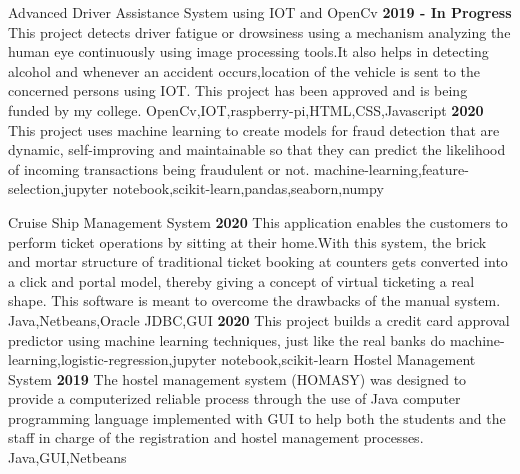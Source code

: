 %
%
%


\begin{projects}
    \project
    {Advanced Driver Assistance System using IOT and OpenCv}
    {\bf\textcolor{Mahogany}{2019 - In Progress}}
    {{}}
    {This project detects driver fatigue or drowsiness using a mechanism analyzing the human eye continuously using image processing tools.It also helps in detecting alcohol and whenever an accident occurs,location of the vehicle is sent to the concerned persons using IOT. This project has been approved and is being funded by my college.}
    {OpenCv,IOT,raspberry-pi,HTML,CSS,Javascript}
    \emptySeparator
	{\bf\textcolor{Mahogany}{2020}}
	{{}}
	{This project uses machine learning to create models for fraud detection that are dynamic, self-improving and maintainable so that they can predict the likelihood of incoming transactions being fraudulent or not.}
	{machine-learning,feature-selection,jupyter notebook,scikit-learn,pandas,seaborn,numpy}
	 
	\project
	{Cruise Ship Management System}
	{\bf\textcolor{Mahogany}{2020}}
	{{}}
	{This application enables the customers to perform ticket operations by sitting at their home.With this system, the brick and mortar structure of traditional ticket booking at counters gets converted into a click and portal model, thereby giving a concept of virtual ticketing a real shape. This software is meant to overcome the drawbacks of the manual system.}
	{Java,Netbeans,Oracle JDBC,GUI}
	\emptySeparator
	{\bf\textcolor{Mahogany}{2020}}
	{{}}
	{This project builds a credit card approval predictor using machine learning techniques, just like the real banks do}
	{machine-learning,logistic-regression,jupyter notebook,scikit-learn}
	\emptySeparator
	\project
	{Hostel Management System}
	{\bf\textcolor{Mahogany}{2019}}
	{{}}
	{The hostel management system (HOMASY) was designed to provide a computerized reliable process through the use of Java computer programming language implemented with GUI to help both the students and the staff in charge of the registration and hostel management processes.}
	{Java,GUI,Netbeans}

\end{projects}